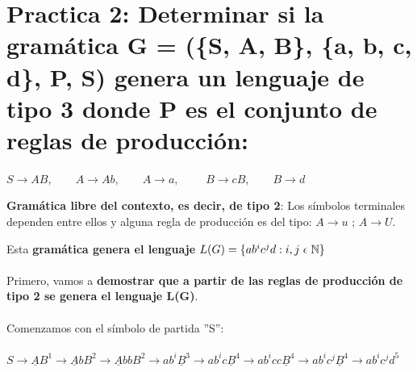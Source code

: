 
\section{Practica 2: Determinar si la gramática G = (\{S, A, B\}, \{a, b, c, d\}, P, S) genera un lenguaje de tipo 3 donde P es el conjunto de reglas de producción:}
\begin{center}
$
S \rightarrow AB, \qquad A \rightarrow Ab, \qquad A \rightarrow a, 
$
$
\qquad B \rightarrow cB, \qquad B \rightarrow d
$
\end{center}


\textbf{Gramática libre del contexto, es decir, de tipo 2}: Los símbolos terminales dependen entre ellos y alguna regla de producción es del tipo: $A \rightarrow u$ ; $A \rightarrow U$.

Esta \textbf{gramática genera el lenguaje $L(G) = \{a b^{i} c^{j} d : i, j \hspace{0.3em} \epsilon \hspace{0.3em} \mathbb{N} \}$} 
\\ \\
Primero, vamos a \textbf{demostrar que a partir de las reglas de producción de tipo 2 se genera el lenguaje L(G)}.
\\ \\
Comenzamos con el símbolo de partida ''S'':
\\ \\
$
S \rightarrow \underline{A}B^{1} \rightarrow \underline{A}bB^{2} \rightarrow \underline{A}bbB^{2} \rightarrow ab^{i}\underline{B}^{3} \rightarrow ab^{i}c\underline{B}^{4} \rightarrow ab^{i}cc\underline{B}^{4} \rightarrow ab^{i}c^{j}\underline{B}^{4} \rightarrow ab^{i}c^{j}d^{5}
$
\\ \\
\\ \\

